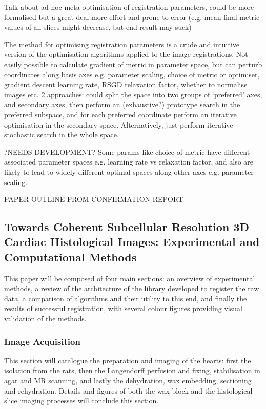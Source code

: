    Talk about ad hoc meta-optimisation of registration parameters, could be more formalised but a great deal more effort and prone to error (e.g. mean final metric values of all slices might decrease, but end result may suck)
    
    The method for optimising registration parameters is a crude and intuitive version of the optimisation algorithms applied to the image registrations. Not easily possible to calculate gradient of metric in parameter space, but can perturb coordinates along basis axes e.g. parameter scaling, choice of metric or optimiser, gradient descent learning rate, RSGD relaxation factor, whether to normalise images etc. 2 approaches: could split the space into two groups of `preferred' axes, and secondary axes, then perform an (exhaustive?) prototype search in the preferred subspace, and for each preferred coordinate perform an iterative optimisation in the secondary space. Alternatively, just perform iterative stochastic search in the whole space.
    
    ?NEEDS DEVELOPMENT? Some params like choice of metric have different associated parameter spaces e.g. learning rate vs relaxation factor, and also are likely to lead to widely different optimal spaces along other axes e.g. parameter scaling.


PAPER OUTLINE FROM CONFIRMATION REPORT
\subsection{Towards Coherent Subcellular Resolution 3D Cardiac Histological Images: Experimental and Computational Methods}
  This paper will be composed of four main sections: an overview of experimental methods, a review of the architecture of the library developed to register the raw data, a comparison of algorithms and their utility to this end, and finally the results of successful registration, with several colour figures providing visual validation of the methods.

  \subsubsection{Image Acquisition}
    This section will catalogue the preparation and imaging of the hearts: first the isolation from the rats, then the Langendorff perfusion and fixing, stabilisation in agar and MR scanning, and lastly the dehydration, wax embedding, sectioning and rehydration. Details and figures of both the wax block and the histological slice imaging processes will conclude this section.

